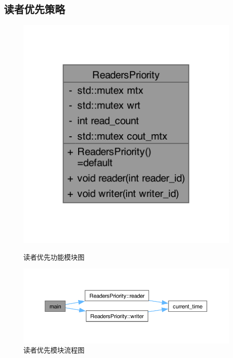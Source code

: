 \subsection{读者优先策略}
\begin{figure}[H]
    \centering
    \begin{minipage}[t]{0.25\textwidth}
        \centering
        \includegraphics[width=\textwidth]{images/readerclass.pdf}
        \caption{读者优先功能模块图}
    \end{minipage}
    \begin{minipage}[t]{0.65\textwidth}
        \centering
        \includegraphics[width=\textwidth]{images/readerflow.pdf}
        \caption{读者优先模块流程图}
    \end{minipage}
\end{figure}


